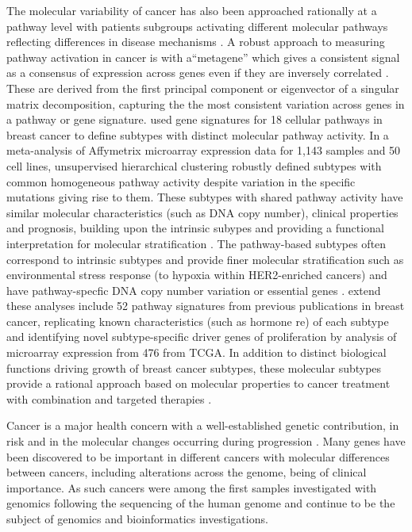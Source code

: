 The molecular variability of cancer has also been approached rationally at a pathway level with patients subgroups activating different molecular pathways reflecting differences in disease mechanisms \citep{Gatza2010}. A robust approach to measuring pathway activation in cancer is with a``metagene'' which gives a consistent signal as a consensus of expression across genes even if they are inversely correlated \citep{Huang2003, Anjomshoaa2008, Nagalla2013}. These are derived from the first principal component or eigenvector of a singular matrix decomposition, capturing the the most consistent variation across genes in a pathway or gene signature. \citet{Gatza2010} used gene signatures for 18 cellular pathways in breast cancer to define subtypes with distinct molecular pathway activity. In a meta-analysis of Affymetrix microarray expression data for 1,143 samples and 50 cell lines, unsupervised hierarchical clustering robustly defined subtypes with common homogeneous pathway activity despite variation in the specific mutations giving rise to them. These subtypes with shared pathway activity have similar molecular characteristics (such as DNA copy number), clinical properties and prognosis, building upon the intrinsic subypes \citep{Parker2009} and providing a functional interpretation for molecular stratification \citep{Gatza2010}. The pathway-based subtypes often correspond to intrinsic subtypes \citep{Gatza2010, Gatza2014} and provide finer molecular stratification such as environmental stress response (to hypoxia within HER2-enriched cancers) \citep{Gatza2011} and have pathway-specfic DNA copy number variation or essential genes \citep{Gatza2014}. \citet{Gatza2014} extend these analyses include 52 pathway signatures from previous publications in breast cancer, replicating known characteristics (such as hormone re) of each subtype and identifying novel subtype-specific driver genes of proliferation by analysis of microarray expression from 476 from \gls{TCGA}. In addition to distinct biological functions driving growth of breast cancer subtypes, these molecular subtypes provide a rational approach based on molecular properties to cancer treatment with combination and targeted therapies  \citep{Hanahan2000, Gatza2010, Gatza2014}.

Cancer is a major health concern with a well-established genetic contribution, in risk and in the molecular changes occurring during progression \citep{Stratton2009}. Many genes have been discovered to be important in different cancers with molecular differences between cancers, including alterations across the genome, being of clinical importance. As such cancers were among the first samples investigated with \gls{genomics} following the sequencing of the human genome \citet{Dickson1999} and continue to be the subject of \gls{genomics} and \gls{bioinformatics} investigations.

